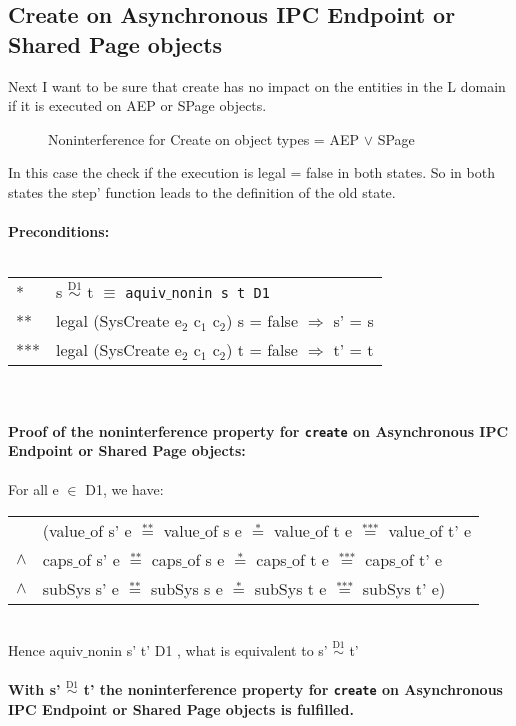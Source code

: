 \subsection{Create on Asynchronous IPC Endpoint or Shared Page objects}
Next I want to be sure that create has no impact on the entities in the L domain if it is executed on AEP or SPage objects.\\
\begin{figure}[H]
\caption{Noninterference for Create on object types = AEP $\vee$ SPage}
\end{figure}
In this case the check if the execution is legal = false in both states. So in both states the step' function leads to the definition of the old state. \\ \\
\textbf{Preconditions:} \\ \\
\begin{tabular}{ll}
* & s $\overset{\text{D1}}{\sim}$ t $\equiv$ \texttt{aquiv$\_$nonin s t D1}	\\ 
** & legal (SysCreate e$_2$ c$_1$ c$_2$) s = false $\Rightarrow$ s' = s \\ 
*** & legal (SysCreate e$_2$ c$_1$ c$_2$) t = false $\Rightarrow$ t' = t
\end{tabular}\\ \\ 
\textbf{Proof of the noninterference property for \texttt{create} on Asynchronous IPC Endpoint or Shared Page objects:}\\ \\
For all e $\in$ D1, we have: \\ 
\begin{tabular}{ll}
& (value$\_$of s' e $\overset{\text{**}}{=}$ value$\_$of s e $\overset{\text{*}}{=}$ value$\_$of t e $\overset{\text{***}}{=}$ value$\_$of t' e \\
$\wedge$ & caps$\_$of s' e $\overset{\text{**}}{=}$ caps$\_$of s e $\overset{\text{*}}{=}$ caps$\_$of t e $\overset{\text{***}}{=}$ caps$\_$of t' e \\
$\wedge$ & subSys s' e $\overset{\text{**}}{=}$ subSys s e $\overset{\text{*}}{=}$ subSys t e $\overset{\text{***}}{=}$ subSys t' e)
\end{tabular} \\
Hence aquiv$\_$nonin s' t' D1 , what is equivalent to s' $\overset{\text{D1}}{\sim}$ t' \\ \\ 
\textbf{With s' $\overset{\text{D1}}{\sim}$ t' the noninterference property for \texttt{create} on Asynchronous IPC Endpoint or Shared Page objects is fulfilled.} 